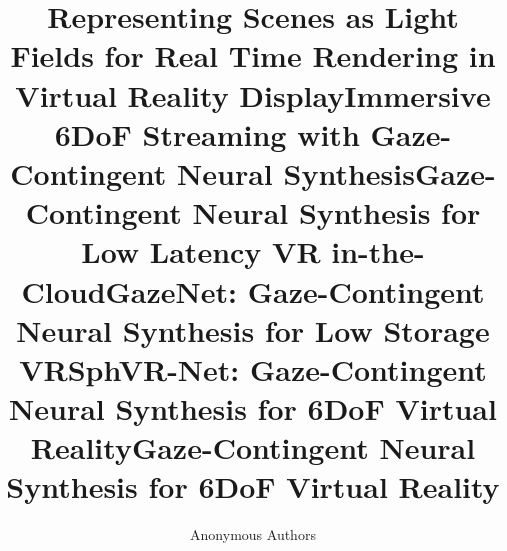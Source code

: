 \title{Representing Scenes as Light Fields for Real Time Rendering in Virtual Reality Display}
\title{Immersive 6DoF Streaming with Gaze-Contingent Neural Synthesis} 
\title{Gaze-Contingent Neural Synthesis for Low Latency VR in-the-Cloud} 
\title{GazeNet: Gaze-Contingent Neural Synthesis for Low Storage VR} 
\title{SphVR-Net: Gaze-Contingent Neural Synthesis for 6DoF Virtual Reality}
\title{Gaze-Contingent Neural Synthesis for 6DoF Virtual Reality} 


\author{Anonymous Authors}

